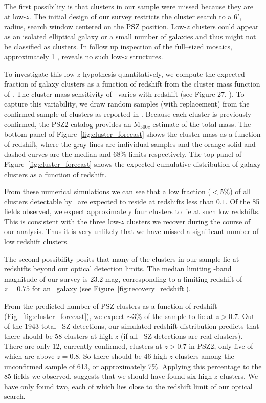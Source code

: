 \documentclass[apj, revtex4-1]{emulateapj}
\begin{document}
The first possibility is that clusters in our sample were missed because they are at low-$z$. The initial design of our survey restricts the cluster search to a $6'$, radius, search window centered on the PSZ position. Low-$z$ clusters could appear as an isolated elliptical galaxy or a small number of galaxies and thus might not be classified as clusters. In follow up inspection of the full--sized mosaics, approximately 1 \degsq, reveals no such low-$z$ structures.

To investigate this low-$z$ hypothesis quantitatively, we compute the expected fraction of galaxy clusters as a function of redshift from the cluster mass function of \cite{Tinker2008}. The cluster mass sensitivity of \planck\ varies with redshift (see Figure 27, \citealt{PlanckCollaboration2015a}). To capture this variability, we draw random samples (with replacement) from the confirmed sample of clusters as reported in \cite{PlanckCollaboration2015a}. Because each cluster is previously confirmed, the PSZ2 catalog provides an M$_{500c}$ estimate of the total mass. The bottom panel of Figure~\ref{fig:cluster_forecast} shows the cluster mass as a function of redshift, where the gray lines are individual samples and the orange solid and dashed curves are the median and 68\% limits respectively. The top panel of Figure~\ref{fig:cluster_forecast} shows the expected cumulative distribution of galaxy clusters as a function of redshift.

From these numerical simulations we can see that a low fraction ($<5\%$) of all clusters detectable by \planck\ are expected to reside at redshifts less than $0.1$. Of the 85 fields observed, we expect approximately four clusters to lie at such low redshifts. This is consistent with the three low-$z$ clusters we recover during the course of our analysis. Thus it is very unlikely that we have missed a significant number of low redshift clusters.

The second possibility posits that many  of the clusters in our sample lie at redshifts beyond our optical detection limits. The median limiting \sdssi-band magnitude of our survey is $23.2$ mag, corresponding to a limiting redshift of $z=0.75$ for an \lstar\ galaxy (see Figure~\ref{fig:recovery_redshift}).

From the predicted number of PSZ clusters as a function of redshift (Fig.~\ref{fig:cluster_forecast}), we expect $\sim3\%$ of the sample to lie at $z>0.7$. Out of the 1943 total \planck\ SZ detections, our simulated redshift distribution predicts that there should be 58 clusters at high-$z$ (if all \planck\ SZ detections are real clusters).  There are only 12, currently confirmed, clusters at $z>0.7$ in PSZ2, only five of which are above $z=0.8$. So there should be 46 high-$z$ clusters among the unconfirmed sample of 613, or approximately 7\%. Applying this percentage to the 85 fields we observed, suggests that we should have found six high-$z$ clusters. We have only found two, each of which lies close to the redshift limit of our optical search.
\end{document}
